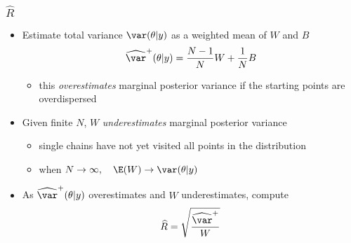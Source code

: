 \documentclass[10pt]{beamer}
\begin{document}
\begin{frame}

\frametitle{ $\widehat{R}$}

  \begin{itemize}
  \item Estimate total variance
    $\var(\theta|y)$ as a weighted mean of $W$ and $B$
    \begin{equation*}
      \widehat{\var}^{+}(\theta|y) = \frac{N-1}{N}W+\frac{1}{N}B
    \end{equation*}
    \vspace{-0.5\baselineskip}
    \begin{itemize}
    \item this \emph{overestimates} marginal posterior variance if the
      starting points are overdispersed
    \end{itemize}
    \vspace{0.5\baselineskip}
  \item<2-> Given finite $N$, $W$ \emph{underestimates} marginal posterior variance
    \begin{itemize}
    \item single chains have not yet visited all points in the distribution
    \item when $N\rightarrow\infty, \quad \E(W)\rightarrow \var(\theta|y)$
    \end{itemize}
    \vspace{0.5\baselineskip}
  \item<3-> As $\widehat{\var}^{+}(\theta|y)$ overestimates and $W$ underestimates,
    compute
    \begin{equation*}
      \widehat{R}=\sqrt{\frac{\widehat{\var}^{+}}{W}}
    \end{equation*}
\end{itemize}

\end{frame}




\end{document}
